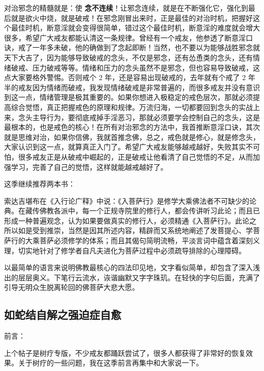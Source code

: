 对治邪念的精髓就是：使 \textbf{念不连续}！让邪念连续，就是在不断强化它，强化到最后就是欲火中烧，就是破戒！在邪念刚冒出来时，正是最佳的对治时机，把握好这个最佳时机，断意淫就会变得很简单，错过这个最佳时机，断意淫的难度就会增大很多，希望广大戒友都能认清这一条规律。曾经有一个戒友，他参透了断意淫口诀，戒了一年多未破，他的确做到了念起即断！当然，也不要以为能够战胜邪念就天下大吉了，因为能够导致破戒的念头，不仅是邪念，还有怂恿类的念头，还有情绪破戒、压力破戒等等。情绪和压力的念头虽然不是邪念，但也容易导致破戒，这点大家要格外警惕。否则戒个 2 年，还是容易出现破戒的，去年就有个戒了 2 年半的戒友因为情绪而破戒，我发现情绪破戒是非常普遍的，而很多戒友并没有意识到这一点，情绪管理是极其重要的。如果你想进入极稳定的戒色层次，那就必须提高综合觉悟，真正把握戒色的原理和规律。万流归海，一切都要回到念头的实战上来，念头主导行为，要彻底戒掉手淫恶习，那就必须要学会控制自己的念头，这是最根本的，也是戒色的核心！在所有对治邪念的方法中，我首推断意淫口诀，其次就是思维对治，如果你信佛，我就首推念佛，总之，戒色就是修心，就是修念头，大家认识到这一点，就算真正入门了。希望广大戒友能够越戒越好，失败其实不可怕，很多戒友正是从破戒中崛起的，正是破戒让他看清了自己觉悟的不足，从而加强学习，完善了自己的觉悟，这样就能越戒越好了。

这季继续推荐两本书：

\begin{book}
    索达吉堪布在《入行论广释》中说：《入菩萨行》是修学大乘佛法者不可缺少的论典。在藏传佛教各派中，每一个正规寺院里的修行人，都会传讲听习此论；而且已形成一种普遍观念，认为如果要做真实的修行人，必须精通《入菩萨行》。此论之所以如是受到推崇，当然是因其所述内容，精辟而又系统地阐述了发菩提心、学菩萨行的大乘菩萨必须修学的体系；而且其偈句简明流畅，平淡言词中蕴含着深刻义理，切实地针对了修学者自凡夫进化为菩萨过程中必须疏导排除的心理障碍。
\end{book}

\begin{book}[《正见》，宗萨蒋扬钦哲仁波切]
    以最简单的语言来说明佛教最核心的四法印见地，文字看似简单，却包含了深入浅出的层层奥义。下笔行云流水，诙谐幽默又字字珠玑。在轻快的字句后面，充满了引导无明众生脱离轮回的佛菩萨大悲大愿。
\end{book}

\subsection{如蛇结自解之强迫症自愈}

前言：

上个帖子是树疗专版，不少戒友都踊跃尝试了，很多人都获得了非常好的恢复效果。关于树疗的一些问题，我在这季前言再集中和大家说一下。

